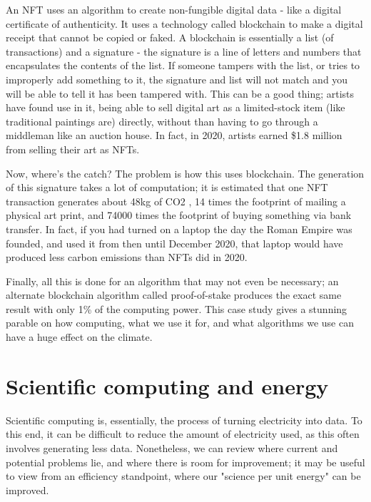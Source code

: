 \documentclass{article}
\begin{document}
An NFT uses an algorithm to create non-fungible digital data - like a digital certificate of authenticity. It uses a technology called blockchain to make a digital receipt that cannot be copied or faked. A blockchain is essentially a list (of transactions) and a signature - the signature is a line of letters and numbers that encapsulates the contents of the list. If someone tampers with the list, or tries to improperly add something to it, the signature and list will not match and you will be able to tell it has been tampered with.\citep{narayanan2017bitcoin} This can be a good thing; artists have found use in it, being able to sell digital art as a limited-stock item (like traditional paintings are) directly, without than having to go through a middleman like an auction house. In fact, in 2020,  artists earned \$1.8 million \citep{redman2020NFT} from selling their art as NFTs.\newline

Now, where's the catch? The problem is how this uses blockchain. The generation of this signature takes a lot of computation; it is estimated that one NFT transaction generates about 48kg of CO2 \citep{atken2020unreasonable}, 14 times the footprint of mailing a physical art print, and 74000 times the footprint of buying something via bank transfer. \citep{qiu2021what} In fact, if you had turned on a laptop the day the Roman Empire was founded, and used it from then until December 2020, that laptop would have produced less carbon emissions than NFTs did in 2020. \citep{atken2020unreasonable} \newline

Finally, all this is done for an algorithm that may not even be necessary; an alternate blockchain algorithm called proof-of-stake produces the exact same result with only 1\% of the computing power. \citep{saleh2021blockchain} This case study gives a stunning parable on how computing, what we use it for, and what algorithms we use can have a huge effect on the climate.



\section{Scientific computing and energy}
Scientific computing is, essentially, the process of turning electricity into data. To this end, it can be difficult to reduce the amount of electricity used, as this often involves generating less data. Nonetheless, we can review where current and potential problems lie, and where there is room for improvement; it may be useful to view from an efficiency standpoint, where our "science per unit energy" can be improved.
\end{document}
